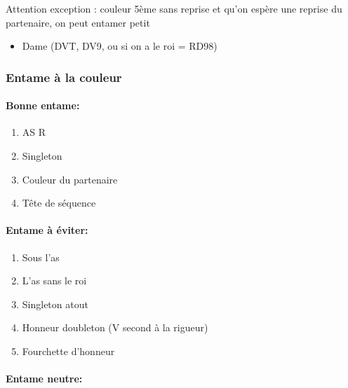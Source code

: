 \documentclass[a4paper]{article}
\begin{document}
Attention exception : couleur 5ème sans reprise et qu’on espère une reprise du partenaire, on peut entamer petit

\begin{itemize}
\item Dame (DVT, DV9, ou si on a le roi = RD98)

\end{itemize}

\subsubsection{Entame à la couleur}

\paragraph{Bonne entame:}

\begin{enumerate}
\item AS R

\item Singleton

\item Couleur du partenaire

\item Tête de séquence

\end{enumerate}

\paragraph{Entame à éviter:}

\begin{enumerate}
\item Sous l’as

\item L’as sans le roi

\item Singleton atout

\item Honneur doubleton (V second à la rigueur)

\item Fourchette d’honneur

\end{enumerate}

\paragraph{Entame neutre:}
\end{document}
